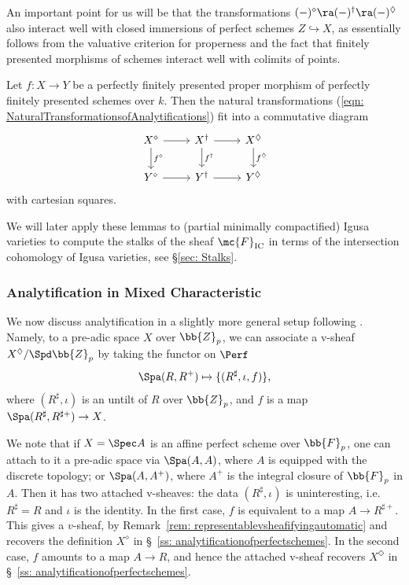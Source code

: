 \documentclass[letterpaper,11pt]{amsart}
\begin{document}
    An important point for us will be that the transformations $(-)^{\diamond} \ra  (-)^{\dagger} \ra (-)^{\Diamond}$ also interact well with closed immersions of perfect schemes $Z \hookrightarrow X$, as essentially follows from the valuative criterion for properness and the fact that finitely presented morphisms of schemes interact well with colimits of points.
    \begin{lemma}{\cite[Lemma~4.2.3]{GHILZIsocComparison}}{\label{lemma: CartesianGivesProper}}
		Let $f \colon X \to Y$ be a perfectly finitely presented proper morphism of perfectly finitely presented schemes over $k$. Then the natural transformations (\ref{eqn: NaturalTransformationsofAnalytifications}) fit into a commutative diagram
		\[ 
			\begin{tikzcd}
				X^{\diamond} \arrow[r] \arrow[d,"f^{\diamond}"] & X^{\dagger} \arrow[r] \arrow[d,"f^{\dagger}"] & X^{\Diamond} \arrow{d}{f^{\Diamond}} \\
				Y^\diamond \arrow{r} & Y^\dagger \arrow{r} & Y^{\Diamond}
			\end{tikzcd}
		\]
		with cartesian squares.
	\end{lemma}

    
We will later apply these lemmas to (partial minimally compactified) Igusa varieties to compute the stalks of the sheaf $\mc{F}_\mathrm{IC}$ in terms of the intersection cohomology of Igusa varieties, see \S \ref{sec: Stalks}.
    
\subsubsection{Analytification in Mixed Characteristic}{\label{ss: AnalytificationinMixedCharacteristic}}
We now discuss analytification in a slightly more general setup following \cite[Lecture 18]{SW}. Namely, to a pre-adic space $X$ over $\bb{Z}_p$, we can associate a v-sheaf $X^{\Diamond}/\Spd \bb{Z}_p$ by taking the functor on $\Perf$
\[\Spa(R,R^+)\mapsto\{(R^\sharp, \iota, f)\},\]
where $(R^\sharp,\iota)$ is an untilt of $R$ over $\bb{Z}_p$, and $f$ is a map $\Spa(R^\sharp, R^{\sharp+})\to X$. 

\begin{remark}
We note that if $X=\Spec A$ is an affine perfect scheme over $\bb{F}_p$, one can attach to it a pre-adic space via $\Spa(A,A)$, where $A$ is equipped with the discrete topology; or $\Spa(A,A^+)$, where $A^+$ is the integral closure of $\bb{F}_p$ in $A$. Then it has two attached v-sheaves: the data $(R^\sharp,\iota)$ is uninteresting, i.e. $R^\sharp=R$ and $\iota$ is the identity. In the first case, $f$ is equivalent to a map $A\to R^{\sharp+}$. This gives a $v$-sheaf, by Remark~\ref{rem: representablevsheafifyingautomatic} and recovers the definition $X^\diamond$ in \S~\ref{ss: analytificationofperfectschemes}. In the second case, $f$ amounts to a map $A\to R$, and hence the attached v-sheaf recovers $X^\Diamond$ in \S~\ref{ss: analytificationofperfectschemes}.
\end{remark}
\end{document}
